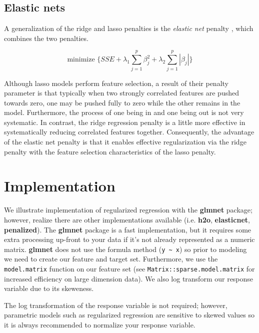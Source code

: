 \documentclass[]{book}
\theoremstyle{definition}
\theoremstyle{definition}
\theoremstyle{definition}
\theoremstyle{remark}
\begin{document}
\hypertarget{elastic}{%
\subsection{Elastic nets}\label{elastic}}

A generalization of the ridge and lasso penalties is the \emph{elastic
net} penalty \citep{zou2005regularization}, which combines the two
penalties.

\begin{equation}
\label{eq:elastic-penalty}
\text{minimize } \bigg \{ SSE + \lambda_1 \sum^p_{j=1} \beta_j^2 + \lambda_2 \sum^p_{j=1} | \beta_j | \bigg \}
\end{equation}

Although lasso models perform feature selection, a result of their
penalty parameter is that typically when two strongly correlated
features are pushed towards zero, one may be pushed fully to zero while
the other remains in the model. Furthermore, the process of one being in
and one being out is not very systematic. In contrast, the ridge
regression penalty is a little more effective in systematically reducing
correlated features together. Consequently, the advantage of the elastic
net penalty is that it enables effective regularization via the ridge
penalty with the feature selection characteristics of the lasso penalty.

\hypertarget{implementation}{%
\section{Implementation}\label{implementation}}

We illustrate implementation of regularized regression with the
\textbf{glmnet} package; however, realize there are other
implementations available (i.e. \textbf{h2o}, \textbf{elasticnet},
\textbf{penalized}). The \textbf{glmnet} package is a fast
implementation, but it requires some extra processing up-front to your
data if it's not already represented as a numeric matrix.
\textbf{glmnet} does not use the formula method
(\texttt{y\ \textasciitilde{}\ x}) so prior to modeling we need to
create our feature and target set. Furthermore, we use the
\texttt{model.matrix} function on our feature set (see
\texttt{Matrix::sparse.model.matrix} for increased efficiency on large
dimension data). We also log transform our response variable due to its
skeweness.

\begin{tip}
The log transformation of the response variable is not required;
however, parametric models such as regularized regression are sensitive
to skewed values so it is always recommended to normalize your response
variable.
\end{tip}
\end{document}
